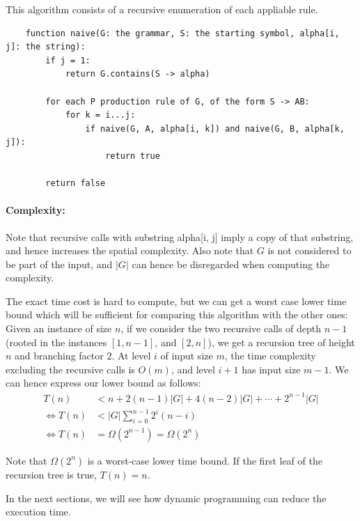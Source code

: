 \documentclass[]{article}
\begin{document}
\begin{multicols}{2}
This algorithm consists of a recursive enumeration of each appliable rule.

\begin{lstlisting}
    function naive(G: the grammar, S: the starting symbol, alpha[i, j]: the string):
        if j = 1:
            return G.contains(S -> alpha)

        for each P production rule of G, of the form S -> AB:
            for k = i...j:
                if naive(G, A, alpha[i, k]) and naive(G, B, alpha[k, j]):
                    return true

        return false
\end{lstlisting}

\paragraph{Complexity:}
Note that recursive calls with substring alpha[i, j] imply a copy of that
substring, and hence increases the spatial complexity. Also note that $G$ is not
considered to be part of the input, and $|G|$ can hence be disregarded when
computing the complexity.

The exact time cost is hard to compute, but we can get a worst case lower time bound which
will be sufficient for comparing this algorithm with the other ones:\\
Given an instance of size $n$, if we consider the two recursive calls of depth
$n-1$ (rooted in the instances $[1, n-1]$, and $[2, n]$), we get a recursion
tree of height $n$ and branching factor $2$. At level $i$ of input size $m$,
the time complexity excluding the recursive calls is $O(m)$, and level $i+1$ has
input size $m-1$. We can
hence express our lower bound as follows:\\
\begin{align*}
  T(n) &< n+2(n-1)|G|+4(n-2)|G|+\cdots +2^{n-1}|G|\\
  \Leftrightarrow T(n) &<|G|\displaystyle\sum_{i=0}^{n-1}2^i(n-i)\\
  \Leftrightarrow T(n) &=\Omega(2^{n-1})=\Omega(2^n)
\end{align*}

Note that $\Omega(2^n)$ is a worst-case lower time bound. If the first leaf of
the recursion tree is true, $T(n)=n$.

In the next sections, we will see how dynamic programming can reduce the execution time.


\end{multicols}
\end{document}
